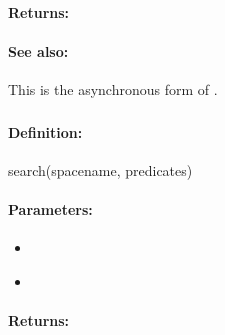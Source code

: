 \paragraph{Returns:}


\paragraph{See also:}  This is the asynchronous form of .

\pagebreak
\subsubsection{}
\label{api:ruby:search}


\paragraph{Definition:}
\begin{rubycode}
search(spacename, predicates)
\end{rubycode}

\paragraph{Parameters:}
\begin{itemize}[noitemsep]
\item {}\\

\item {}\\

\end{itemize}

\paragraph{Returns:}


\pagebreak
\subsubsection{}
\label{api:ruby:sorted_search}


